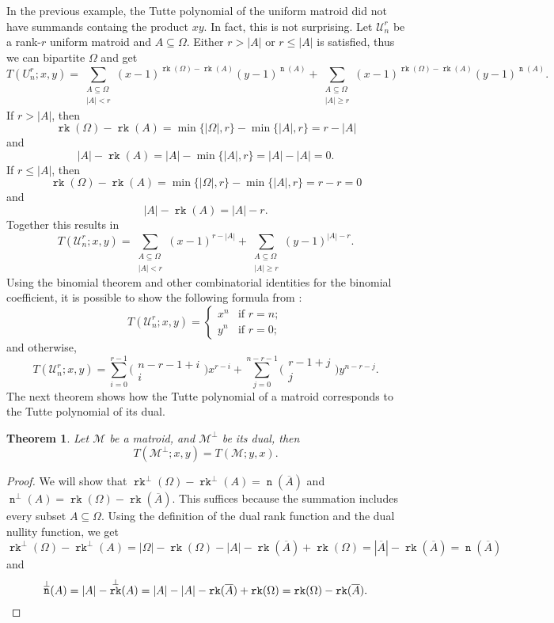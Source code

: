 \documentclass[12pt,a4paper, twoside, autooneside=false]{scrartcl}
\newtheorem{theorem}{Theorem}[section]
\theoremstyle{definition}
\theoremstyle{remark}
\numberwithin{equation}{section}
\DeclareMathOperator{\rk}{\mathtt{rk}}
\DeclareMathOperator{\n}{\mathtt{n}}
\newcommand{\M}{\mathcal{M}} %
\begin{document}
In the previous example, the Tutte polynomial of the uniform matroid did not have summands containg the product $xy$. In fact, this is not surprising. Let $\mathcal{U}_n^r$ be a rank-$r$ uniform matroid and $A \subseteq \Omega$. Either $r > |A|$ or $r \leq |A|$ is satisfied, thus we can bipartite $\Omega$ and get 
\[
T(U_{n}^r;x,y) = \sum_{\substack{A \subseteq \Omega \\ 
|A| < r}} (x - 1)^{\rk(\Omega) - \rk(A)} (y - 1)^{\n(A)} + \sum_{\substack{A \subseteq \Omega \\
|A| \geq r}} (x - 1)^{\rk(\Omega) - \rk(A)}(y - 1)^{\n(A)}.
\]
If $r > |A|$, then 
\[
\rk(\Omega) - \rk(A) = \min\{|\Omega|, r\} - \min\{|A|, r\} = r - |A|
\]
and 
\[
|A| - \rk(A) = |A| - \min\{|A|,r\} = |A| - |A| = 0.
\]
If $r \leq |A|$, then 
\[
\rk(\Omega) - \rk(A) =  \min\{|\Omega|, r\} - \min\{|A|, r\} = r - r = 0
\]
and 
\[
|A| - \rk(A) = |A| - r. 
\]
Together this results in
\[
T(\mathcal{U}_{n}^r;x,y) = \sum_{\substack{A \subseteq \Omega \\ 
|A| < r}} (x - 1)^{r - |A|} + \sum_{\substack{A \subseteq \Omega \\
|A| \geq r}}(y - 1)^{|A| - r}.
\]
Using the binomial theorem and other combinatorial identities for the binomial coefficient, it is possible to show the following formula from \cite{ElMo2022}:
\[T(\mathcal{U}_n^r; x,y) =\begin{cases}
x^n & \text{if } r = n;\\
y^n& \text{if } r = 0;
\end{cases}\]
and otherwise, 
\[
T(\mathcal{U}_n^r; x,y) = \sum_{i = 0}^{r - 1} \biggl(\begin{matrix}
n - r - 1 + i \\
i
\end{matrix}\biggr)x^{r - i} + \sum_{j = 0}^{n - r - 1} \biggl(\begin{matrix}
r - 1 + j \\
j
\end{matrix}\biggr) y^{n - r - j}.
\]
\indent The next theorem shows how the Tutte polynomial of a matroid corresponds to the Tutte polynomial of its dual. 
\begin{theorem}
Let $\M$ be a matroid, and $\M^\perp$ be its dual, then 
\[
T(\M^\perp;x,y) = T(\M;y,x).
\]
\end{theorem}
\begin{proof}
We will show that $\rk^\perp(\Omega) - \rk^\perp(A) = \n(\overline{A})$ and $\n^\perp(A) = \rk(\Omega) - \rk(\overline{A})$. This suffices because the summation includes every subset $A \subseteq \Omega$. Using the definition of the dual rank function and the dual nullity function, we get 
\[
\rk^\perp(\Omega) - \rk^\perp(A) = |\Omega| - \rk(\Omega) - |A| - \rk(\overline{A}) + \rk(\Omega) = |\overline{A}| - \rk(\overline{A}) = \n(\overline{A})
\]
and 
\[
\n^\perp(A) = |A| - \rk^\perp(A) = |A| - |A| - \rk(\overline{A}) + \rk(\Omega) = \rk(\Omega) - \rk(\overline{A}). \qedhere
\]
\end{proof}
\end{document}
